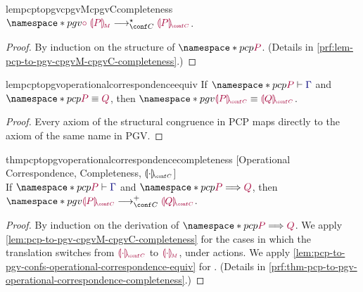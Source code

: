 \documentclass[main.tex]{subfiles}
\begin{document}
\begin{restatablelemma}{lempcptopgvcpgvMcpgvCcompleteness}
  \label{lem:pcp-to-pgv-cpgvM-cpgvC-completeness}
  $\pgv{\tm{\child\;\cpgvM{P}}\cred^\star\tm{\cpgvC{P}}}$.
\end{restatablelemma}
\begin{proof}
  By induction on the structure of $\pcp{\tm{P}}$.
  (Details in \cref{prf:lem-pcp-to-pgv-cpgvM-cpgvC-completeness}.)
\end{proof}

\begin{restatablelemma}{lempcptopgvoperationalcorrespondenceequiv}%
  \label{lem:pcp-to-pgv-confs-operational-correspondence-equiv}
  If $\pcp{\seq{P}{\ty{\Gamma}}}$ and $\pcp{\tm{P}\equiv\tm{Q}}$,
  then $\pgv{\tm{\cpgvC{P}}\equiv\tm{\cpgvC{Q}}}$.
\end{restatablelemma}
\begin{proof}
  \label{prf:lem-pcp-to-pgv-confs-operational-correspondence-equiv}
  Every axiom of the structural congruence in PCP maps directly to the axiom of the same name in PGV.
\end{proof}

\begin{restatabletheorem}{thmpcptopgvoperationalcorrespondencecompleteness}%
  [Operational Correspondence, Completeness, $\cpgvC{\cdot}$]
  \label{thm:pcp-to-pgv-operational-correspondence-completeness}
  \hfill\\%
  If $\pcp{\seq{P}{\ty{\Gamma}}}$ and $\pcp{\tm{P}\red\tm{Q}}$,
  then $\pgv{\tm{\cpgvC{P}}\cred^+\tm{\cpgvC{Q}}}$.
\end{restatabletheorem}
\begin{proof}
  By induction on the derivation of $\pcp{\tm{P}\red\tm{Q}}$.
  We apply \cref{lem:pcp-to-pgv-cpgvM-cpgvC-completeness} for the cases in which
  the translation switches from $\tm{\cpgvC{\cdot}}$ to $\tm{\cpgvM{\cdot}}$,
  \ie under actions.
  We apply \cref{lem:pcp-to-pgv-confs-operational-correspondence-equiv} for
  . 
  (Details in \cref{prf:thm-pcp-to-pgv-operational-correspondence-completeness}.)
\end{proof}
\end{document}
